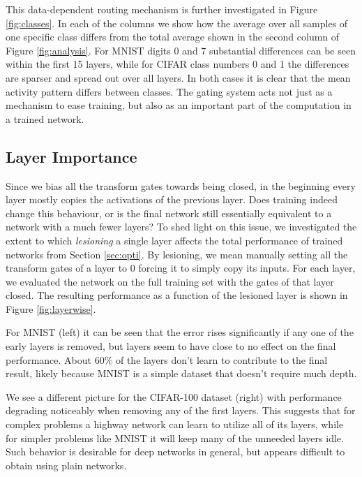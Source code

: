 \documentclass{article}
\begin{document}
This data-dependent routing mechanism is further investigated in Figure \ref{fig:classes}. 
In each of the columns we show how the average over all samples of one specific class differs from the total average shown in the second column of Figure \ref{fig:analysis}.
For MNIST digits 0 and 7 substantial differences can be seen within the first 15 layers, while for CIFAR class numbers 0 and 1 the differences are sparser and spread out over all layers.
In both cases it is clear that the mean activity pattern differs between classes.
The gating system acts not just as a mechanism to ease training, but also as an important part of the computation in a trained network.

\subsection{Layer Importance}

Since we bias all the transform gates towards being closed, in the beginning every layer mostly copies the activations of the previous layer. 
Does training indeed change this behaviour, or is the final network still essentially equivalent to a network with a much fewer layers?
To shed light on this issue, we investigated the extent to which \textit{lesioning} a single layer affects the total performance of trained networks from Section \ref{sec:opti}. By lesioning, we mean manually setting all the transform gates of a layer to 0 forcing it to simply copy its inputs.
For each layer, we evaluated the network on the full training set with the gates of that layer closed. The resulting performance as a function of the lesioned layer is shown in Figure \ref{fig:layerwise}.

For MNIST (left) it can be seen that the error rises significantly if any one of the early layers is removed, but layers  seem to have close to no effect on the final performance. About 60\% of the layers don't learn to contribute to the final result, likely because MNIST is a simple dataset that doesn't require much depth.

We see a different picture for the CIFAR-100 dataset (right) with performance degrading noticeably when removing any of the first  layers. 
This suggests that for complex problems a highway network can learn to utilize all of its layers, while for simpler problems like MNIST it will keep many of the unneeded layers idle. Such behavior is desirable for deep networks in general, but appears difficult to obtain using plain networks.
\end{document}
